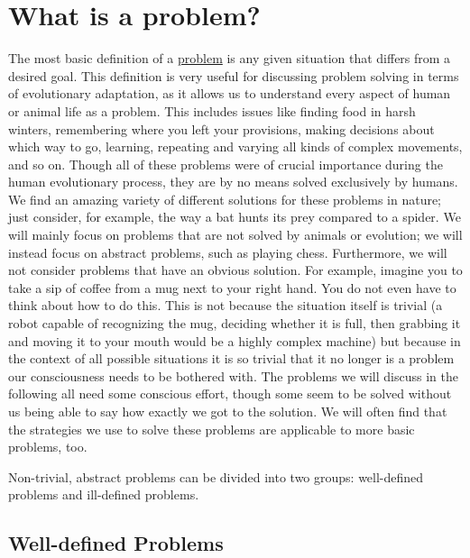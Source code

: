 \documentclass[
]{krantz}
\begin{document}
\hypertarget{what-is-a-problem}{%
\section{What is a problem?}\label{what-is-a-problem}}

The most basic definition of a \protect\hyperlink{problem}{problem} is any given situation that differs from a desired goal. This definition is very useful for discussing problem solving in terms of evolutionary adaptation, as it allows us to understand every aspect of human or animal life as a problem. This includes issues like finding food in harsh winters, remembering where you left your provisions, making decisions about which way to go, learning, repeating and varying all kinds of complex movements, and so on. Though all of these problems were of crucial importance during the human evolutionary process, they are by no means solved exclusively by humans. We find an amazing variety of different solutions for these problems in nature; just consider, for example, the way a bat hunts its prey compared to a spider. We will mainly focus on problems that are not solved by animals or evolution; we will instead focus on abstract problems, such as playing chess. Furthermore, we will not consider problems that have an obvious solution. For example, imagine you to take a sip of coffee from a mug next to your right hand. You do not even have to think about how to do this. This is not because the situation itself is trivial (a robot capable of recognizing the mug, deciding whether it is full, then grabbing it and moving it to your mouth would be a highly complex machine) but because in the context of all possible situations it is so trivial that it no longer is a problem our consciousness needs to be bothered with. The problems we will discuss in the following all need some conscious effort, though some seem to be solved without us being able to say how exactly we got to the solution. We will often find that the strategies we use to solve these problems are applicable to more basic problems, too.

Non-trivial, abstract problems can be divided into two groups: well-defined problems and ill-defined problems.

\hypertarget{well-defined-problems}{%
\subsection*{Well-defined Problems}\label{well-defined-problems}}
\end{document}
